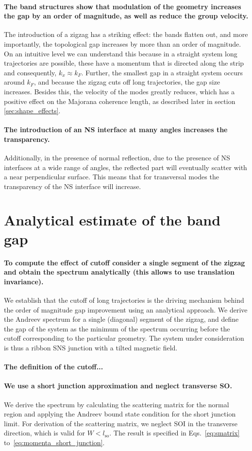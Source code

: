 \documentclass[english, twocolumn, 10pt, aps, superscriptaddress, floatfix, prb, citeautoscript]{revtex4-1}
\renewcommand{\comment}[2]{#2}
\renewcommand{\comment}{\paragraph}
\begin{document}
\comment{The band structures show that modulation of the geometry increases the gap by an order of magnitude, as well as reduce the group velocity.}
The introduction of a zigzag has a striking effect: the bands flatten out, and more importantly, the topological gap increases by more than an order of magnitude.
On an intuitive level we can understand this because in a straight system long trajectories are possible, these have a momentum that is directed along the strip and consequently, $k_x \approx k_F$.
Further, the smallest gap in a straight system occurs around $k_F$, and because the zigzag cuts off long trajectories, the gap size increases.
Besides this, the velocity of the modes greatly reduces, which has a positive effect on the Majorana coherence length, as described later in section \ref{sec:shape_effects}.

\comment{The introduction of an NS interface at many angles increases the transparency.}
Additionally, in the presence of normal reflection, due to the presence of NS interfaces at a wide range of angles, the reflected part will eventually scatter with a near perpendicular surface.
This means that for transversal modes the transparency of the NS interface will increase.


\section{Analytical estimate of the band gap}

\comment{To compute the effect of cutoff consider a single segment of the zigzag and obtain the spectrum analytically (this allows to use translation invariance).}
We establish that the cutoff of long trajectories is the driving mechanism behind the order of magnitude gap improvement using an analytical approach.
We derive the Andreev spectrum for a single (diagonal) segment of the zigzag, and define the gap of the system as the minimum of the spectrum occurring before the cutoff corresponding to the particular geometry.
The system under consideration is thus a ribbon SNS junction with a tilted magnetic field.

\comment{The definition of the cutoff...}

\comment{We use a short junction approximation and neglect transverse SO.}
We derive the spectrum by calculating the scattering matrix for the normal region and applying the Andreev bound state condition for the short junction limit\cite{beenakker1991universal, sticlet_robustness_2017}.
For derivation of the scattering matrix, we neglect SOI in the transverse direction, which is valid for $W<l_\text{so}$.
The result is specified in Eqs.~\eqref{eq:smatrix} to~\eqref{eq:momenta_short_junction}.
\end{document}
